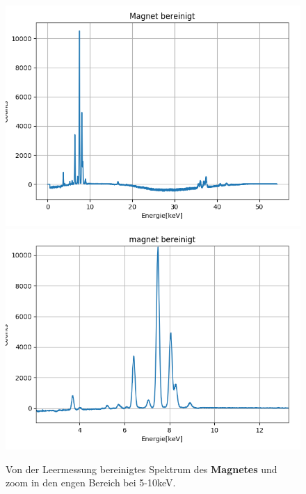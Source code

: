 \documentclass[12pt,a4paper]{article}
\begin{document}
\begin{figure}[H]
\centering
\includegraphics[scale=0.49]{Bilder/roentgen_spektren/magnet_0.png}
\includegraphics[scale=0.49]{Bilder/roentgen_spektren/magnet_1.png}
\caption{Von der Leermessung bereinigtes Spektrum des \textbf{Magnetes} und zoom in den engen Bereich bei  5-10keV.}
\label{fig:prop_magnet}
\end{figure}
\end{document}
